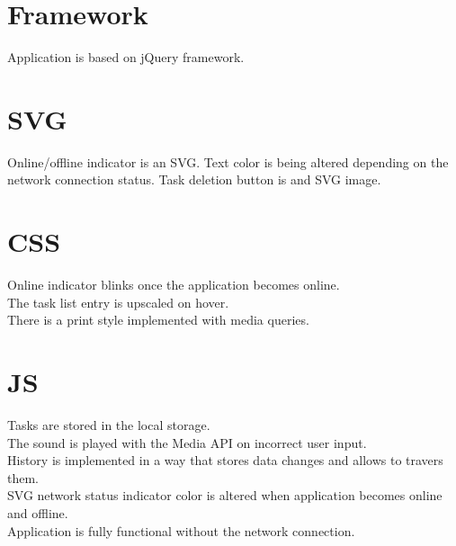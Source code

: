 \documentclass{article}
\begin{document}
\section{Framework}
Application is based on jQuery framework.
\section{SVG}
Online/offline indicator is an SVG. Text color is being altered depending on the network connection status. Task deletion button is and SVG image.
\section{CSS}
Online indicator blinks once the application becomes online.\\
The task list entry is upscaled on hover.\\
There is a print style implemented with media queries.
\section{JS}
Tasks are stored in the local storage.\\
The sound is played with the Media API on incorrect user input.\\
History is implemented in a way that stores data changes and allows to travers them.\\
SVG network status indicator color is altered when application becomes online and offline.\\
Application is fully functional without the network connection.
\end{document}
